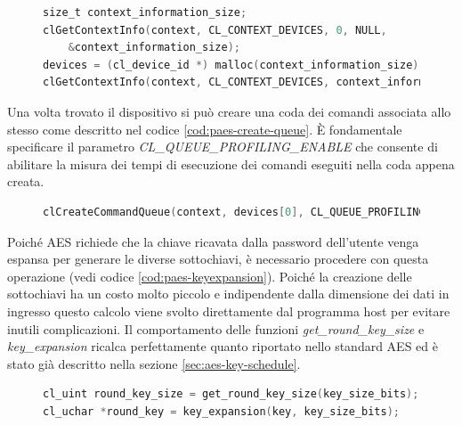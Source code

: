 \documentclass[12pt,a4paper,oneside]{book}
\begin{document}
\begin{figure}
\begin{lstlisting}[caption={\textit{Selezione del device da utilizzare.}},label={cod:paes-device},language=C]
size_t context_information_size;
clGetContextInfo(context, CL_CONTEXT_DEVICES, 0, NULL,
    &context_information_size);
devices = (cl_device_id *) malloc(context_information_size);
clGetContextInfo(context, CL_CONTEXT_DEVICES, context_information_size, devices, NULL);
\end{lstlisting}
\end{figure}

Una volta trovato il dispositivo si può creare una coda dei comandi associata allo stesso come descritto nel codice \ref{cod:paes-create-queue}. È fondamentale specificare il parametro \textit{CL\_QUEUE\_PROFILING\_ENABLE} che consente di abilitare la misura dei tempi di esecuzione dei comandi eseguiti nella coda appena creata.

\begin{figure}
\begin{lstlisting}[caption={\textit{Creazione di una coda di comandi.}},label={cod:paes-create-queue},language=C]
clCreateCommandQueue(context, devices[0], CL_QUEUE_PROFILING_ENABLE, &error);
\end{lstlisting}
\end{figure}

Poiché \ac{AES} richiede che la chiave ricavata dalla password dell'utente venga espansa per generare le diverse sottochiavi, è necessario procedere con questa operazione (vedi codice \ref{cod:paes-keyexpansion}). Poiché la creazione delle sottochiavi ha un costo molto piccolo e indipendente dalla dimensione dei dati in ingresso questo calcolo viene svolto direttamente dal programma host per evitare inutili complicazioni. Il comportamento delle funzioni \textit{get\_round\_key\_size} e \textit{key\_expansion} ricalca perfettamente quanto riportato nello standard \ac{AES} ed è stato già descritto nella sezione \ref{sec:aes-key-schedule}.

\begin{figure}
\begin{lstlisting}[caption={\textit{Creazione delle sottochiavi \ac{AES}.}},label={cod:paes-keyexpansion},language=C]
cl_uint round_key_size = get_round_key_size(key_size_bits);
cl_uchar *round_key = key_expansion(key, key_size_bits);
\end{lstlisting}
\end{figure}
\end{document}
